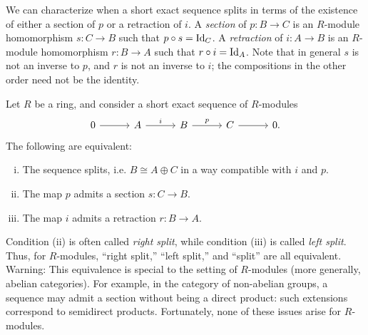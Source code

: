 \documentclass[12pt,reqno]{amsart}
\begin{document}
We can characterize when a short exact sequence splits in terms of the existence of either a section of $p$ or a retraction of $i$. A \emph{section} of $p:B \to C$ is an $R$-module homomorphism $s:C \to B$ such that $p \circ s = \operatorname{Id}_{C}$. A \emph{retraction} of $i:A \to B$ is an $R$-module homomorphism $r:B \to A$ such that $r \circ i = \operatorname{Id}_{A}$. Note that in general $s$ is not an inverse to $p$, and $r$ is not an inverse to $i$; the compositions in the other order need not be the identity.

\begin{lemma}
Let $R$ be a ring, and consider a short exact sequence of $R$-modules
\[
\begin{tikzcd}[row sep = .3em, column sep = 3em]
0 \arrow[r] & A \arrow[r, "i"] & B \arrow[r, "p"] & C \arrow[r] & 0.
\end{tikzcd}
\]
The following are equivalent:
\begin{enumerate}[(i)]
\item The sequence splits, i.e. $B \cong A \oplus C$ in a way compatible with $i$ and $p$.
\item The map $p$ admits a section $s:C \to B$.
\item The map $i$ admits a retraction $r:B \to A$.
\end{enumerate}
\end{lemma}

Condition (ii) is often called \emph{right split}, while condition (iii) is called \emph{left split}. Thus, for $R$-modules, ``right split,'' ``left split,'' and ``split'' are all equivalent. Warning: This equivalence is special to the setting of $R$-modules (more generally, abelian categories). For example, in the category of non-abelian groups, a sequence may admit a section without being a direct product: such extensions correspond to semidirect products. Fortunately, none of these issues arise for $R$-modules.

\hrulefill
\end{document}
